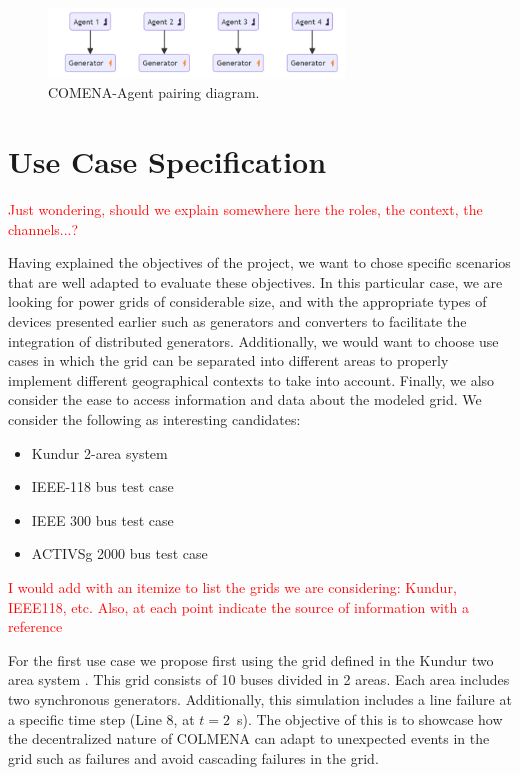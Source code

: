 \documentclass{article}
\begin{document}

\begin{figure}[!htb]
    \centering
    \includegraphics[width=0.7\textwidth]{pictures/colmena_pairing.png}
    \caption{COMENA-Agent pairing diagram.}
    \label{fig:diagram_pairing}
\end{figure}


\section{Use Case Specification}
\textcolor{red}{Just wondering, should we explain somewhere here the roles, the context, the channels...?}

Having explained the objectives of the project, we want to chose specific scenarios that are well adapted to evaluate these objectives. In this particular case, we are looking for power grids of considerable size, and with the appropriate types of devices presented earlier such as generators and converters to facilitate the integration of distributed generators. Additionally, we would want to choose use cases in which the grid can be separated into different areas to properly implement different geographical contexts to take into account. Finally, we also consider the ease to access information and data about the modeled grid. We consider the following as interesting candidates: 

\begin{itemize}
    \item Kundur 2-area system \cite{grids:kundur}
    \item IEEE-118 bus test case \cite{grids:ieee118} 
    \item IEEE 300 bus test case  \cite{grids:ieee300} 
    \item ACTIVSg 2000 bus test case  \cite{grids:activsg2000} 
\end{itemize}

\textcolor{red}{I would add with an itemize to list the grids we are considering: Kundur, IEEE118, etc. Also, at each point indicate the source of information with a reference}

For the first use case we propose first using the grid defined in the Kundur two area system  \cite{grids:kundur}. This grid consists of 10 buses divided in 2 areas. Each area includes two synchronous generators. Additionally, this simulation includes a line failure at a specific time step (Line 8, at $t=2$~s). The objective of this is to showcase how the decentralized nature of COLMENA can adapt to unexpected events in the grid such as failures and avoid cascading failures in the grid. 
\end{document}
